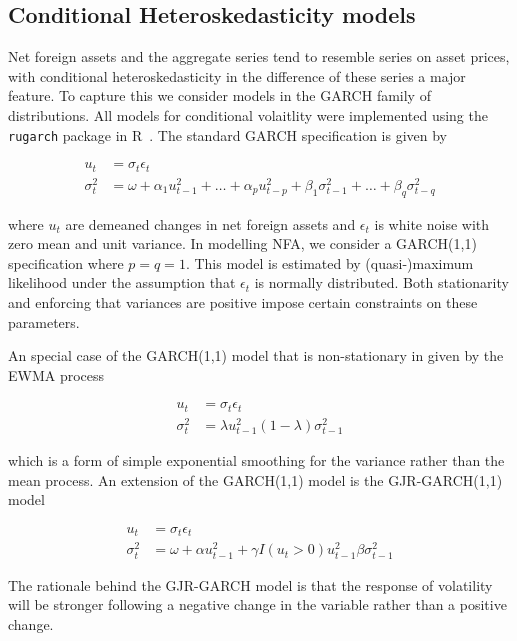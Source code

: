 \subsection{Conditional Heteroskedasticity models}

Net foreign assets and the aggregate series tend to resemble series on asset prices, with conditional heteroskedasticity in the difference of these series a major feature. To capture this we consider models in the GARCH family of distributions. All models for conditional volaitlity were implemented using the \texttt{rugarch} package in R~\citep{rugpac}. The standard GARCH specification \citep{Bol1986} is given by

\begin{align}
  u_t&=\sigma_t\epsilon_t\\
  \sigma_t^2&=\omega+\alpha_1u^2_{t-1}+\dots+\alpha_pu^2_{t-p}+\beta_1\sigma^2_{t-1}+\dots+\beta_q\sigma^2_{t-q}
\end{align}

where $u_t$ are demeaned changes in net foreign assets and $\epsilon_t$ is white noise with zero mean and unit variance. In modelling NFA, we consider a GARCH(1,1) specification where $p=q=1$. This model is estimated by (quasi-)maximum likelihood under the assumption that $\epsilon_t$ is normally distributed. Both stationarity and enforcing that variances are positive impose certain constraints on these parameters.

An special case of the GARCH(1,1) model that is non-stationary in given by the EWMA process 

\begin{align}
  u_t&=\sigma_t\epsilon_t\\
  \sigma_t^2&=\lambda u^2_{t-1}(1-\lambda)\sigma^2_{t-1}
\end{align}

which is a form of simple exponential smoothing for the variance rather than the mean process. An extension of the GARCH(1,1) model is the GJR-GARCH(1,1) model \citep{GloEtAl1993}

\begin{align}
  u_t&=\sigma_t\epsilon_t\\
  \sigma_t^2&=\omega+\alpha u^2_{t-1}+\gamma I(u_t>0)u^2_{t-1}\beta\sigma^2_{t-1}
\end{align}

The rationale behind the GJR-GARCH model is that the response of volatility will be stronger following a negative change in the variable rather than a positive change.

